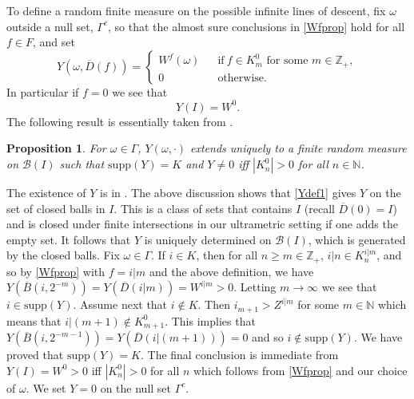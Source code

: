 \documentclass[12pt]{article}
\makeatletter
\renewenvironment{proof}[1][\proofname]{%
\par\pushQED{\qed}\normalfont%
\topsep6\p@\@plus6\p@\relax
\trivlist\item[\hskip\labelsep\bfseries#1\@addpunct{.}]%
\ignorespaces
}{%
\popQED\endtrivlist\@endpefalse
}
\newtheorem{proposition}[theorem]{Proposition}
\numberwithin{theorem}{section}
\theoremstyle{def}
\numberwithin{equation}{section}
\newcommand{\Z}{\mathbb{Z}}
\newcommand{\N}{\mathbb{N}}
\newcommand{\cB}{\mathcal B}
\newcommand{\supp}{\mathrm{supp}}
\makeatother
\begin{document}
To define a random finite measure on the possible infinite lines of descent, fix $\omega$ outside a null set, $\Gamma^c$, so that the almost sure conclusions in \eqref{Wfprop} hold for all $f\in F$, and set
\begin{equation}\label{Ydef1}
Y(\omega,\overline D(f))=\begin{cases}
W^f(\omega)\  \ &\text{ if}\ f\in K^0_m \text{ for some }m\in\Z_+,\\
0&\text{ otherwise}.
\end{cases}
\end{equation}
In particular if $f=0$ we see that 
\begin{equation}\label{Ymass}
	Y(I)=W^0.
\end{equation}
The following result is essentially taken from \cite{H}. 
\begin{proposition}\label{Y} For $\omega\in\Gamma$, $Y(\omega,\cdot)$ extends uniquely to a finite random measure on $\cB(I)$ such that %
$\supp(Y)=K$ and $Y\neq 0$ iff $|K^0_n|>0$ for all $n\in\N$.
\end{proposition}
\begin{proof} The existence of $Y$ is in \cite{H}. The above discussion shows that \eqref{Ydef1} gives $Y$ on the set of closed balls in $I$. This is a class of sets that contains $I$ (recall $\overline D(0)=I$) and is closed under finite intersections in our ultrametric setting if one adds the empty set.  It follows that $Y$ is uniquely determined on $\cB(I)$, which is generated by the closed balls. Fix $\omega\in\Gamma$.  If $i\in K$, then for all $n\ge m\in\Z_+$, $i|n\in K^{i|m}_n$, and so by \eqref{Wfprop} with $f=i|m$ and the above definition, we have $Y(\overline B(i,2^{-m}))=Y(\overline D(i|m))=W^{i|m}>0$. Letting $m\to\infty$ we see that $i\in\supp(Y)$. 
Assume next that $i\notin K$. Then $i_{m+1}>Z^{i|m}$ for some $m\in\N$ which means that $i|(m+1)\notin K^0_{m+1}$. 
This implies that $Y(\overline B(i,2^{-m-1}))=Y(\overline D(i|(m+1)))=0$ and so $i\notin\supp(Y)$.  We have proved that $\supp(Y)=K$.  The final conclusion is immediate from $Y(I)=W^0>0$ iff $|K^0_n|>0$ for all $n$ which follows from \eqref{Wfprop} and our choice of $\omega$.
\end{proof}
We set $Y=0$ on the null set $\Gamma^c$.
\end{document}
